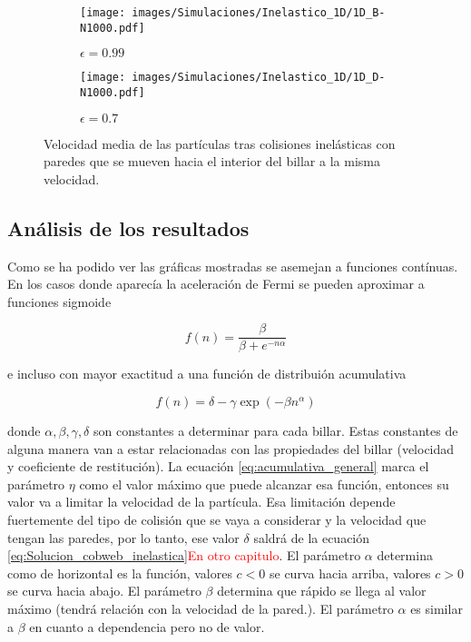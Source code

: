 \begin{figure}[H]
    \begin{subfigure}[b]{0.5\textwidth}
        \centering
        \texttt{[image: images/Simulaciones/Inelastico\_1D/1D\_B-N1000.pdf]}
        \caption{$\epsilon = 0.99$}
    \end{subfigure}
    \hfill
    \begin{subfigure}[b]{0.5\textwidth}
        \centering
        \texttt{[image: images/Simulaciones/Inelastico\_1D/1D\_D-N1000.pdf]}
        \caption{$\epsilon = 0.7$}
    \end{subfigure}
    \caption{Velocidad media de las partículas tras colisiones inelásticas con paredes que se mueven hacia el interior del billar a la misma velocidad.}
    \label{fig:1D_inelastic_B}
\end{figure}

\subsection{Análisis de los resultados}

Como se ha podido ver las gráficas mostradas se asemejan a funciones contínuas. En los casos donde aparecía la aceleración de Fermi se pueden aproximar a funciones sigmoide

\begin{equation}
    f(n) = \dfrac{\beta}{\beta + e^{-n\alpha}}
\end{equation}

e incluso con mayor exactitud a una función de distribuión acumulativa

\begin{equation}\label{eq:acumulativa_general}
    f(n) = \delta - \gamma\exp(-\beta n^\alpha)
\end{equation}

donde \( \alpha, \beta, \gamma, \delta \) son constantes a determinar para cada billar. Estas constantes de alguna manera van a estar relacionadas con las propiedades del billar (velocidad y coeficiente de restitución). La ecuación \ref{eq:acumulativa_general} marca el parámetro \( \eta \) como el valor máximo que puede alcanzar esa función, entonces su valor va a limitar la velocidad de la partícula. Esa limitación depende fuertemente del tipo de colisión que se vaya a considerar y la velocidad que tengan las paredes, por lo tanto, ese valor \( \delta \) saldrá de la ecuación \ref{eq:Solucion_cobweb_inelastica}\textcolor{red}{En otro capitulo}. El parámetro \( \alpha \) determina como de horizontal es la función, valores \( c < 0 \) se curva hacia arriba, valores \( c > 0 \) se curva hacia abajo. El parámetro \( \beta \) determina que rápido se llega al valor máximo (tendrá relación con la velocidad de la pared.). El parámetro \( \alpha \) es similar a \( \beta \) en cuanto a dependencia pero no de valor.

